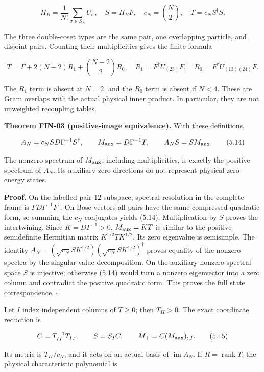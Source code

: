 \[
\Pi_B=\frac1{N!}\sum_{\sigma\in S_N}U_\sigma,
\quad S=\Pi_BF,\quad c_N=\binom N2,
\quad T=c_NS^\dagger S.
\tag{5.12}
\]

The three double-coset types are the same pair, one overlapping particle, and disjoint pairs. Counting their multiplicities gives the finite formula

\[
T=\Gamma+2(N-2)R_1+\binom{N-2}{2}R_0,
\quad
R_1=F^\dagger U_{(23)}F,
\quad R_0=F^\dagger U_{(13)(24)}F.
\tag{5.13}
\]

The \(R_1\) term is absent at \(N=2\), and the \(R_0\) term is absent if \(N<4\). These are Gram overlaps with the actual physical inner product. In particular, they are not unweighted recoupling tables.

\textbf{Theorem FIN-03 (positive-image equivalence).} With these definitions,

\[
A_N=c_NS D\Gamma^{-1}S^\dagger,
\qquad M_{\rm aux}=D\Gamma^{-1}T,
\qquad A_NS=SM_{\rm aux}.
\tag{5.14}
\]

The nonzero spectrum of \(M_{\rm aux}\), including multiplicities, is exactly the positive spectrum of \(A_N\). Its auxiliary zero directions do not represent physical zero-energy states.

\textbf{Proof.} On the labelled pair-\(12\) subspace, spectral resolution in the complete frame is \(FD\Gamma^{-1}F^\dagger\). On Bose vectors all pairs have the same compressed quadratic form, so summing the \(c_N\) conjugates yields (5.14). Multiplication by \(S\) proves the intertwining. Since \(K=D\Gamma^{-1}>0\), \(M_{\rm aux}=KT\) is similar to the positive semidefinite Hermitian matrix \(K^{1/2}TK^{1/2}\). Its zero eigenvalue is semisimple. The identity \(A_N=(\sqrt{c_N}SK^{1/2})(\sqrt{c_N}SK^{1/2})^\dagger\) proves equality of the nonzero spectra by the singular-value decomposition. On the auxiliary nonzero spectral space \(S\) is injective; otherwise (5.14) would turn a nonzero eigenvector into a zero column and contradict the positive quadratic form. This proves the full state correspondence. \(\square\)

Let \(I\) index independent columns of \(T\ge0\); then \(T_{II}>0\). The exact coordinate reduction is

\[
C=T_{II}^{-1}T_{I,:},\qquad
S=S_I C,\qquad
M_+=C(M_{\rm aux})_{:,I}.
\tag{5.15}
\]

Its metric is \(T_{II}/c_N\), and it acts on an actual basis of \(\operatorname{im}A_N\). If \(R=\operatorname{rank}T\), the physical characteristic polynomial is


